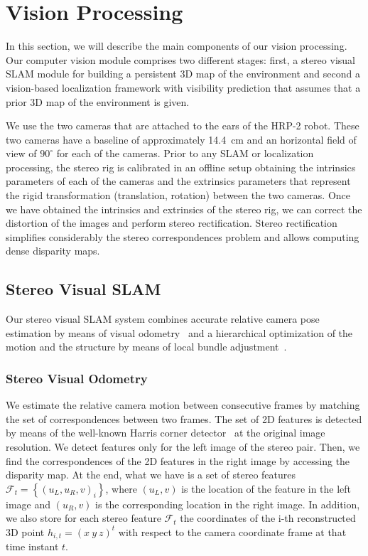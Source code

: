 
\section{Vision Processing}\label{sec:vision}
In this section, we will describe the main components of our vision processing. Our computer vision module comprises two different stages: first, a stereo visual SLAM module for building a persistent 3D map of the environment and second a vision-based localization framework with visibility prediction that assumes that a prior 3D map of the environment is given. 

We use the two cameras that are attached to the ears of the HRP-2 robot. These two cameras have a baseline of approximately 14.4~cm and an horizontal field of view of $90^{\circ}$ for each of the cameras. Prior to any SLAM or localization processing, the stereo rig is calibrated in an offline setup obtaining the intrinsics parameters of each of the cameras and the extrinsics parameters that represent the rigid transformation (translation, rotation) between the two cameras. Once we have obtained the intrinsics and extrinsics of the stereo rig, we can correct the distortion of the images and perform stereo rectification. Stereo rectification simplifies considerably the stereo correspondences problem and allows computing dense disparity maps.

\subsection{Stereo Visual SLAM}\label{sec:vslam}
Our stereo visual SLAM system combines accurate relative camera pose estimation by means of visual odometry~\cite{Kaess09icra} and a hierarchical optimization of the motion and the structure by means of
local bundle adjustment~\cite{Mouragnon09ivc}.

\subsubsection{Stereo Visual Odometry}\label{sec:visual_odometry}
We estimate the relative camera motion between consecutive frames by matching the set of correspondences between two frames. The set of 2D features is detected by means of the well-known Harris corner detector~\cite{Harris88avc} at the original image resolution. We detect features only for the left image of the stereo pair. Then, we find the correspondences of the 2D features in the right image by
accessing the disparity map. At the end, what we have is a set of stereo features
$\mathcal{F}_{t}=\left\{\left(u_{L},u_{R},v\right)_{i}\right\}$, where $\left(u_{L},v\right)$ is the location of the feature in the left image and $\left(u_{R},v\right)$ is the corresponding location in the
right image. In addition, we also store for each stereo feature $\mathcal{F}_{t}$ the coordinates of the i-th reconstructed 3D point $h_{i,t}=\left(x \ y \ z\right)^{t}$ with respect to the camera
coordinate frame at that time instant $t$.

